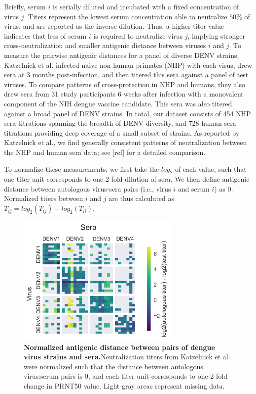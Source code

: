 \documentclass[11pt,oneside,letterpaper]{article}
\begin{document}
Briefly, serum $i$ is serially diluted and incubated with a fixed concentration of virus $j$.
Titers represent the lowest serum concentration able to neutralize $50\%$ of virus, and are reported as the inverse dilution.
Thus, a higher titer value indicates that less of serum $i$ is required to neutralize virus $j$, implying stronger cross-neutralization and smaller antigenic distance between viruses $i$ and $j$.
To measure the pairwise antigenic distances for a panel of diverse DENV strains, Katzelnick et al. infected naive non-human primates (NHP) with each virus, drew sera at 3 months post-infection, and then titered this sera against a panel of test viruses.
To compare patterns of cross-protection in NHP and humans, they also drew sera from 31 study participants 6 weeks after infection with a monovalent component of the NIH dengue vaccine candidate.
This sera was also titered against a broad panel of DENV strains.
In total, our dataset consists of 454 NHP sera titrations spanning the breadth of DENV diversity, and 728 human sera titrations providing deep coverage of a small subset of strains.
As reported by Katzelnick et al., we find generally consistent patterns of neutralization between the NHP and human sera data; see [ref] for a detailed comparison.

To normalize these measurements, we first take the $log_2$ of each value, such that one titer unit corresponds to one 2-fold dilution of sera.
We then define antigenic distance between autologous virus-sera pairs (i.e., virus $i$ and serum $i$) as 0.
Normalized titers between $i$ and $j$ are thus calculated as $T_{ij} = log_2(T_{ij}) - log_2(T_{ii})$.

\begin{figure}[h]
\begin{centering}
\includegraphics[width=0.7\textwidth]{../figures/png/titer_heatmap.png}
    \caption{\textbf{Normalized antigenic distance between pairs of dengue virus strains and sera.}\linebreak Neutralization titers from Katzelnick et al. were normalized such that the distance between autologous virus:serum pairs is 0, and each titer unit corresponds to one 2-fold change in PRNT50 value. Light gray areas represent missing data.}
     \label{titer_heatmap}
\end{centering}
\end{figure}
\end{document}
